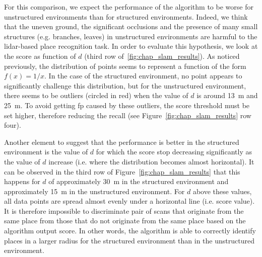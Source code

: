 For this comparison, we expect the performance of the algorithm to be worse for unstructured environments than for structured environments. Indeed, we think that the uneven ground, the significant occlusions and the presence of many small structures (e.g. branches, leaves) in unstructured environments are harmful to the \gls*{lidar}-based place recognition task. In order to evaluate this hypothesis, we look at the score as function of $d$ (third row of~\ref{fig:chap_slam_results}). As noticed previously, the distribution of points seems to represent a function of the form $f(x) = 1 / x$. In the case of the structured environment, no point appears to significantly challenge this distribution, but for the unstructured environment, there seems to be outliers (circled in red) when the value of $d$ is around \SI{13}{\meter} and \SI{25}{\meter}. To avoid getting \gls*{fp} caused by these outliers, the score threshold must be set higher, therefore reducing the recall (see Figure~\ref{fig:chap_slam_results} row four).

Another element to suggest that the performance is better in the structured environment is the value of $d$ for which the score stop decreasing significantly as the value of $d$ increase (i.e. where the distribution becomes almost horizontal). It can be observed in the third row of Figure~\ref{fig:chap_slam_results} that this happens for $d$ of approximately \SI{30}{\meter} in the structured environment and approximately \SI{15}{\meter} in the unstructured environment. For $d$ above these values, all data points are spread almost evenly under a horizontal line (i.e. score value). It is therefore impossible to discriminate pair of scans that originate from the same place from those that do not originate from the same place based on the algorithm output score. In other words, the algorithm is able to correctly identify places in a larger radius for the structured environment than in the unstructured environment.


